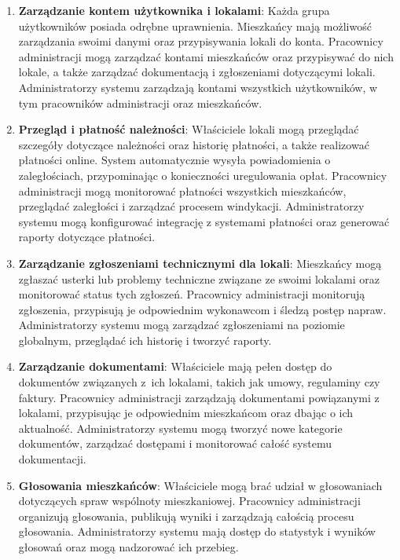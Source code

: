 \begin{enumerate}[label=\arabic*.,labelwidth=\widthof{10}]

    \item \textbf{Zarządzanie kontem użytkownika i lokalami}: Każda grupa użytkowników posiada odrębne uprawnienia. Mieszkańcy mają możliwość zarządzania swoimi danymi oraz przypisywania lokali do konta. Pracownicy administracji mogą zarządzać kontami mieszkańców oraz przypisywać do nich lokale, a także zarządzać dokumentacją i zgłoszeniami dotyczącymi lokali. Administratorzy systemu zarządzają kontami wszystkich użytkowników, w tym pracowników administracji oraz mieszkańców.

	\item \textbf{Przegląd i płatność należności}: Właściciele lokali mogą przeglądać szczegóły dotyczące należności oraz historię płatności, a także realizować płatności online. System automatycznie wysyła powiadomienia o zaległościach, przypominając o konieczności uregulowania opłat. Pracownicy administracji mogą monitorować płatności wszystkich mieszkańców, przeglądać zaległości i zarządzać procesem windykacji. Administratorzy systemu mogą konfigurować integrację z systemami płatności oraz generować raporty dotyczące płatności.

	\item \textbf{Zarządzanie zgłoszeniami technicznymi dla lokali}: Mieszkańcy mogą zgłaszać usterki lub problemy techniczne związane ze swoimi lokalami oraz monitorować status tych zgłoszeń. Pracownicy administracji monitorują zgłoszenia, przypisują je odpowiednim wykonawcom i śledzą postęp napraw. Administratorzy systemu mogą zarządzać zgłoszeniami na poziomie globalnym, przeglądać ich historię i tworzyć raporty.

	\item \textbf{Zarządzanie dokumentami}: Właściciele mają pełen dostęp do dokumentów związanych z~ich lokalami, takich jak umowy, regulaminy czy faktury. Pracownicy administracji zarządzają dokumentami powiązanymi z lokalami, przypisując je odpowiednim mieszkańcom oraz dbając o ich aktualność. Administratorzy systemu mogą tworzyć nowe kategorie dokumentów, zarządzać dostępami i monitorować całość systemu dokumentacji.

	\item \textbf{Głosowania mieszkańców}: Właściciele mogą brać udział w głosowaniach dotyczących spraw wspólnoty mieszkaniowej. Pracownicy administracji organizują głosowania, publikują wyniki i zarządzają całością procesu głosowania. Administratorzy systemu mają dostęp do statystyk i wyników głosowań oraz mogą nadzorować ich przebieg.
	

\end{enumerate}
